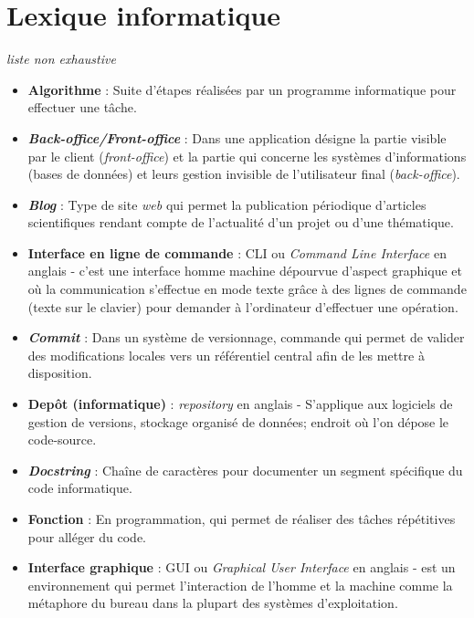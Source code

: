 \chapter*{Lexique informatique}

\textit{\small{liste non exhaustive}}

\begin{itemize}
    \item \textbf{Algorithme} : Suite d'étapes réalisées par un programme informatique pour effectuer une tâche.
    \item \textbf{\textit{Back-office/Front-office}} : Dans une application désigne la partie visible par le client (\textit{front-office}) et la partie qui concerne les systèmes d'informations (bases de données) et leurs gestion invisible de l'utilisateur final (\textit{back-office}).
    \item \textbf{\textit{Blog}} : Type de site \textit{web} qui permet la publication périodique d'articles scientifiques rendant compte de l'actualité d'un projet ou d'une thématique.
    \item \textbf{Interface en ligne de commande} : CLI ou \textit{Command Line Interface} en anglais - c'est une interface homme machine dépourvue d'aspect graphique et où la communication s'effectue en mode texte grâce à des lignes de commande (texte sur le clavier) pour demander à l'ordinateur d'effectuer une opération.
    \item \textbf{\textit{Commit}} : Dans un système de versionnage, commande qui permet de valider des modifications locales vers un référentiel central afin de les mettre à disposition.
    \item \textbf{Depôt (informatique)} : \textit{repository} en anglais -  S'applique aux logiciels de gestion de versions, stockage organisé de données; endroit où l'on dépose le code-source.
    \item \textbf{\textit{Docstring}} : Chaîne de caractères pour documenter un segment spécifique du code informatique.
    \item \textbf{Fonction} : En programmation,  qui permet de réaliser des tâches répétitives pour alléger du code.
    \item \textbf{Interface graphique} : GUI ou \textit{Graphical User Interface} en anglais - est un environnement qui permet l'interaction de l'homme et la machine comme la métaphore du bureau dans la plupart des systèmes d'exploitation.

\end{itemize}
